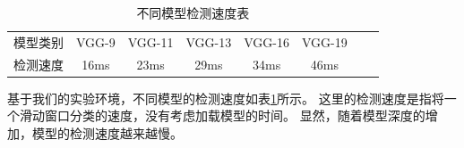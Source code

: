 \begin{table}[htbp]
\centering
\begin{tabular}{cccccccp{38mm}}
\toprule
\mbox{模型类别} & \mbox{VGG-9} & \mbox{VGG-11} & \mbox{VGG-13} & \mbox{VGG-16} & \mbox{VGG-19}  \\
\mbox{检测速度} & 16ms & 23ms & 29ms & 34ms & 46ms  \\
\bottomrule
\end{tabular}
\caption{不同模型检测速度表}
\label{tab:jiancesudu}
\end{table}
基于我们的实验环境，不同模型的检测速度如表\ref{tab:jiancesudu}所示。
这里的检测速度是指将一个滑动窗口分类的速度，没有考虑加载模型的时间。
显然，随着模型深度的增加，模型的检测速度越来越慢。

